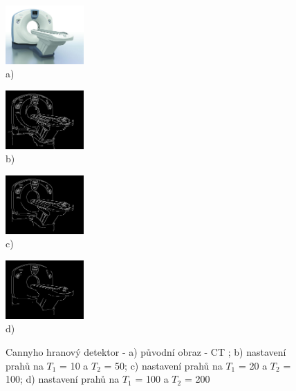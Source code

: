 \documentclass{thesis}%
\begin{document}
 \begin{figure}[htp!]
  \centering
  
   \begin{minipage}[c]{\textwidth}
	\centering\includegraphics[width=3cm]{ctmach.jpg}\\
     a)
   \end{minipage}
    \begin{minipage}[c]{0.3\textwidth}
	\centering\includegraphics[width=3cm]{canny/Canny10_50.jpg}\\
     b)
   \end{minipage}
    \begin{minipage}[c]{0.3\textwidth}
	\centering\includegraphics[width=3cm]{canny/Canny20_100.jpg}\\
     c)
   \end{minipage}
    \begin{minipage}[c]{0.3\textwidth}
	\centering\includegraphics[width=3cm]{canny/Canny100_200.jpg}\\
     d)
   \end{minipage}


	\caption[Cannyho hranový detektor]{Cannyho hranový detektor - a) původní obraz - CT ; b) nastavení prahů na $T_1$ = 10 a $T_2$ = 50; c)  nastavení prahů na $T_1$ = 20 a $T_2$ = 100; d) nastavení prahů na $T_1$ = 100 a $T_2$ = 200}
\end{figure}
\end{document}
